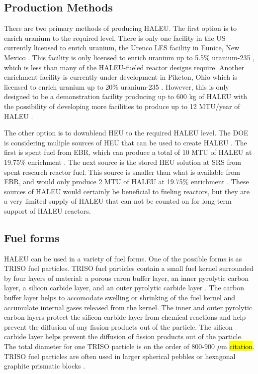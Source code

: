 \subsection{Production Methods}
There are two primary methods of producing \gls{HALEU}. The first 
option is to enrich uranium to the required level. There is only one 
facility in the US currently 
licensed to enrich uranium, the Urenco LES facility in Eunice, 
New Mexico \cite{noauthor_establishing_2022}. This facility is only 
licensed to enrich uranium up to 5.5\% uranium-235 \cite{noauthor_establishing_2022},
which is less than many of the \gls{HALEU}-fueled reactor designs 
require. Another enrichment facility is currently under development in 
Piketon, Ohio which is licensed to enrich uranium up to 20\% 
uranium-235 \cite{noauthor_establishing_2022}. However, this is only 
designed to be a demonstration facility producing up to 600 kg of 
\gls{HALEU} \cite{us_nrc_centrus_2021} with the possibility of 
developing more facilities to produce up to 12 MTU/year of \gls{HALEU}
\cite{noauthor_establishing_2022}.

The other option is to downblend \gls{HEU} to the required \gls{HALEU}
level. The \gls{DOE} is considering muliple sources of \gls{HEU} that can 
be used to create \gls{HALEU} \cite{noauthor_establishing_2022}. The 
first is spent fuel from \gls{EBR}, which can produce a total of 10 MTU 
of \gls{HALEU} at 19.75\% enrichment \cite{noauthor_establishing_2022}. 
The next source is the stored \gls{HEU} solution at \gls{SRS} from 
spent research reactor fuel. This source is smaller than what is 
available from \gls{EBR}, and would only produce 2 MTU of \gls{HALEU} 
at 19.75\% enrichment \cite{noauthor_establishing_2022}. These sources of 
\gls{HALEU} would certainly be beneficial to fueling reactors, but they 
are a very limited supply of \gls{HALEU} that can not be counted on 
for long-term support of \gls{HALEU} reactors. 


\subsection{Fuel forms}
\gls{HALEU} can be used in a variety of fuel forms. One of the possible 
forms is as \gls{TRISO} fuel particles. \gls{TRISO} fuel particles contain 
a small fuel kernel surrounded by four layers of material: a porous caron 
buffer layer, an inner pyrolytic carbon layer, a silicon carbide layer, and 
an outer pyrolytic carbide layer \cite{powers_fully_2014}. The carbon buffer
layer helps to accomodate swelling or shrinking of the fuel kernel and 
accumulate internal gases released from the kernel. The inner and outer 
pyrolytic carbon layers protect the silicon carbide layer from chemical 
reactions and help prevent the diffusion of any fission products out of the 
particle. The silicon carbide layer helps prevent the diffusion of fission 
products out of the particle. The total diameter for one \gls{TRISO} 
particle is on the order of 800-900 $\mu$m \hl{citation}. \gls{TRISO} fuel 
particles are often used in 
larger spherical pebbles or hexagonal graphite prismatic blocks 
\cite{powers_fully_2014}.

